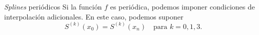 \begin{frame}{\textit{Splines} periódicos}
  Si la función $f$ es periódica, podemos imponer condiciones de
  interpolación adicionales. En este caso, podemos suponer
  \[
    S^{(k)} (x_0) = S^{(k)} (x_n) \quad \text{para } k = 0, 1, 3.
  \]
\end{frame}
